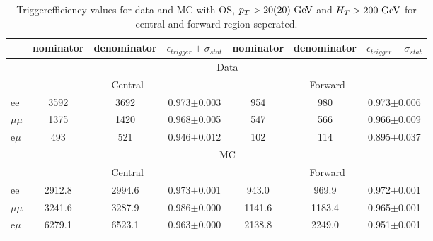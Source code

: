 
\begin{table}[hbp] \caption{Triggerefficiency-values for data and MC with OS, $p_T>20(20)\,\,\text{Ge\hspace{-.08em}V}$ and $H_T>200\,\,\text{Ge\hspace{-.08em}V}$ for central and forward region seperated.} 
\centering 
\renewcommand{\arraystretch}{1.2} 
\begin{tabular}{l|c|c|c|c|c|c}     

 & nominator & denominator & $\epsilon_{trigger} \pm \sigma_{stat}$ &  nominator & denominator & $\epsilon_{trigger} \pm \sigma_{stat}$  \\ 
\hline

&\multicolumn{6}{c}{Data} \\
\hline
&  \multicolumn{3}{c|}{Central } & \multicolumn{3}{|c}{ Forward }\\
\hline
ee & 3592 & 3692 & 0.973$\pm$0.003 & 954 & 980 & 0.973$\pm$0.006 \\
$\mu\mu$ & 1375 & 1420 & 0.968$\pm$0.005 & 547 & 566 & 0.966$\pm$0.009 \\
e$\mu$ & 493 & 521 & 0.946$\pm$0.012 & 102 & 114 & 0.895$\pm$0.037 \\
 
 


& \multicolumn{6}{c}{MC} \\
\hline
&  \multicolumn{3}{c|}{Central } & \multicolumn{3}{|c}{ Forward } \\
\hline 
ee & 2912.8 & 2994.6 & 0.973$\pm$0.001 & 943.0 & 969.9 & 0.972$\pm$0.001 \\
$\mu\mu$ & 3241.6 & 3287.9 & 0.986$\pm$0.000 & 1141.6 & 1183.4 & 0.965$\pm$0.001 \\
e$\mu$ & 6279.1 & 6523.1 & 0.963$\pm$0.000 & 2138.8 & 2249.0 & 0.951$\pm$0.001 \\
    
    \hline 
\end{tabular}  
\label{tab:EffValues_Seperated}
\end{table}	
